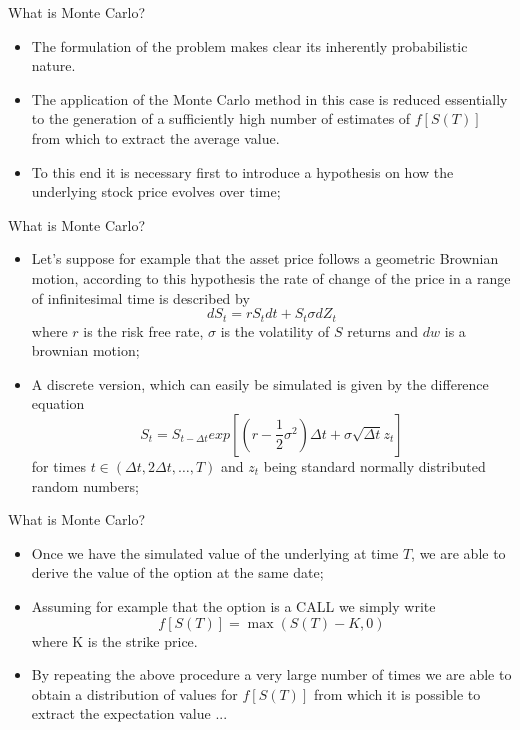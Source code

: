 \documentclass[11pt]{beamer}
\newcommand*{\itemimg}[1]{%
  \raisebox{-.3\baselineskip}{%
    \texttt{[image: \#1]}%
  }%
}
\begin{document}
\begin{frame}{What is Monte Carlo?}
\begin{itemize}
\item The formulation of the problem makes clear its inherently probabilistic nature. 
\item The application of the Monte Carlo method in this case is reduced essentially to the generation of a sufficiently high number of estimates of $f[S(T)]$ from which to extract the average value. 
\item[\itemimg{./img/attention.jpg}] To this end it is necessary first to introduce a hypothesis on how the underlying stock price evolves over time;
\end{itemize}
\end{frame}
\begin{frame}{What is Monte Carlo?}
\begin{itemize}
\item Let's suppose for example that the asset price follows a geometric Brownian motion, according to this hypothesis the rate of change of the price in a range of infinitesimal time is described by
$$dS_t = rS_tdt + S_t\sigma dZ_t$$
where $r$ is the risk free rate, $\sigma$ is the volatility of $S$ returns and $dw$ is a brownian motion;
\item [\itemimg{./img/attention.jpg}] A discrete version, which can easily be simulated is given by
the difference equation 
$$ S_t = S_{t-\Delta t} exp \left[
\left( r - \frac{1}{2} \sigma^2 \right) \Delta t + \sigma \sqrt{\Delta t} z_t 
\right]$$
for times $t \in (\Delta t, 2 \Delta t, \dots, T )$ and $z_t$ being standard normally distributed random numbers; 
\end{itemize}
\end{frame}
\begin{frame}{What is Monte Carlo?}
\begin{itemize}
\item Once we have the simulated value of the underlying at time $T$, we are able to derive the value of the option at the same date;
\item Assuming for example that the option is a CALL we simply write
$$f[S(T)] = \max(S(T)-K,0)$$
where K is the strike price. 
\item By repeating the above procedure a very large number of times we are able to obtain a distribution of values for $f[S(T)]$ from which it is possible to extract the expectation value ... 
\end{itemize}
\end{frame}
\end{document}
